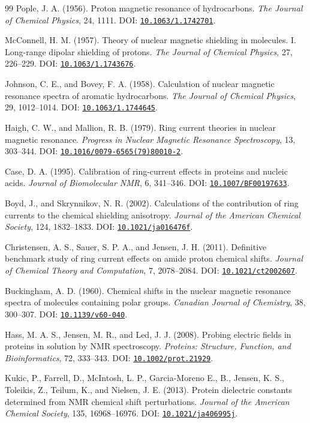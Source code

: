 \documentclass[11pt]{article}
\newcommand{\doi}[1]{\href{https://doi.org/#1}{\nolinkurl{#1}}}
\begin{document}
\begin{thebibliography}{99}
Pople, J. A. (1956).
Proton magnetic resonance of hydrocarbons.
\emph{The Journal of Chemical Physics}, 24, 1111.
DOI: \doi{10.1063/1.1742701}.

McConnell, H. M. (1957).
Theory of nuclear magnetic shielding in molecules. I. Long-range dipolar
shielding of protons.
\emph{The Journal of Chemical Physics}, 27, 226--229.
DOI: \doi{10.1063/1.1743676}.

Johnson, C. E., and Bovey, F. A. (1958).
Calculation of nuclear magnetic resonance spectra of aromatic hydrocarbons.
\emph{The Journal of Chemical Physics}, 29, 1012--1014.
DOI: \doi{10.1063/1.1744645}.

Haigh, C. W., and Mallion, R. B. (1979).
Ring current theories in nuclear magnetic resonance.
\emph{Progress in Nuclear Magnetic Resonance Spectroscopy}, 13, 303--344.
DOI: \doi{10.1016/0079-6565(79)80010-2}.

Case, D. A. (1995).
Calibration of ring-current effects in proteins and nucleic acids.
\emph{Journal of Biomolecular NMR}, 6, 341--346.
DOI: \doi{10.1007/BF00197633}.

Boyd, J., and Skrynnikov, N. R. (2002).
Calculations of the contribution of ring currents to the chemical shielding
anisotropy.
\emph{Journal of the American Chemical Society}, 124, 1832--1833.
DOI: \doi{10.1021/ja016476f}.

Christensen, A. S., Sauer, S. P. A., and Jensen, J. H. (2011).
Definitive benchmark study of ring current effects on amide proton chemical
shifts.
\emph{Journal of Chemical Theory and Computation}, 7, 2078--2084.
DOI: \doi{10.1021/ct2002607}.

Buckingham, A. D. (1960).
Chemical shifts in the nuclear magnetic resonance spectra of molecules
containing polar groups.
\emph{Canadian Journal of Chemistry}, 38, 300--307.
DOI: \doi{10.1139/v60-040}.

Hass, M. A. S., Jensen, M. R., and Led, J. J. (2008).
Probing electric fields in proteins in solution by NMR spectroscopy.
\emph{Proteins: Structure, Function, and Bioinformatics}, 72, 333--343.
DOI: \doi{10.1002/prot.21929}.

Kukic, P., Farrell, D., McIntosh, L. P., Garcia-Moreno E., B.,
Jensen, K. S., Toleikis, Z., Teilum, K., and Nielsen, J. E. (2013).
Protein dielectric constants determined from NMR chemical shift perturbations.
\emph{Journal of the American Chemical Society}, 135, 16968--16976.
DOI: \doi{10.1021/ja406995j}.


\end{thebibliography}
\end{document}
